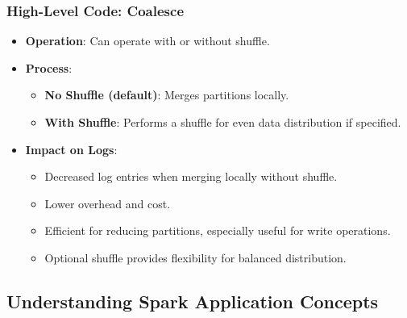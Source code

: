\begin{frame}
    \frametitle{High-Level Code: Coalesce}

    \begin{itemize}
        \begin{itemize}
            \item \textbf{Operation}: Can operate with or without shuffle.
            \item \textbf{Process}:
            \begin{itemize}
                \item \textbf{No Shuffle (default)}: Merges partitions locally.
                \item \textbf{With Shuffle}: Performs a shuffle for even data distribution if specified.
            \end{itemize}
            \item \textbf{Impact on Logs}:
            \begin{itemize}
                \item Decreased log entries when merging locally without shuffle.
                \item Lower overhead and cost.
                \item Efficient for reducing partitions, especially useful for write operations.
                \item Optional shuffle provides flexibility for balanced distribution.
            \end{itemize}
        \end{itemize}
    \end{itemize}
\end{frame}
%
%

\subsection{Understanding Spark Application Concepts}\label{subsec:understanding-spark-application-concepts}

